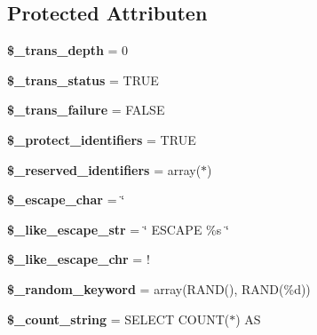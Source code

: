 \subsection*{Protected Attributen}
\begin{DoxyCompactItemize}
\item 
\mbox{\label{class_c_i___d_b__driver_a0724b7f82d62f35ef5e150146ed2a27b}} 
{\bfseries \$\+\_\+trans\+\_\+depth} = 0
\item 
\mbox{\label{class_c_i___d_b__driver_a93acf0189d34131e156c6eb4a48c2b5b}} 
{\bfseries \$\+\_\+trans\+\_\+status} = T\+R\+UE
\item 
\mbox{\label{class_c_i___d_b__driver_afb63c722ff858ef7a4f662ec2930aad3}} 
{\bfseries \$\+\_\+trans\+\_\+failure} = F\+A\+L\+SE
\item 
\mbox{\label{class_c_i___d_b__driver_a2e8a156a3c2abda43a4f160bcb5252e9}} 
{\bfseries \$\+\_\+protect\+\_\+identifiers} = T\+R\+UE
\item 
\mbox{\label{class_c_i___d_b__driver_aa3298c4c62fbee8bb09f1b75b633fb0d}} 
{\bfseries \$\+\_\+reserved\+\_\+identifiers} = array(\textquotesingle{}$\ast$\textquotesingle{})
\item 
\mbox{\label{class_c_i___d_b__driver_aaec2fb0112850159063a8e47ad3aed6e}} 
{\bfseries \$\+\_\+escape\+\_\+char} = \textquotesingle{}\char`\"{}\textquotesingle{}
\item 
\mbox{\label{class_c_i___d_b__driver_adf86ecadf3d0e1ce3f5e0eaeeb3867ae}} 
{\bfseries \$\+\_\+like\+\_\+escape\+\_\+str} = \char`\"{} E\+S\+C\+A\+PE \textquotesingle{}\%s\textquotesingle{} \char`\"{}
\item 
\mbox{\label{class_c_i___d_b__driver_a668acfd923d0342389cd3a614628cf2a}} 
{\bfseries \$\+\_\+like\+\_\+escape\+\_\+chr} = \textquotesingle{}!\textquotesingle{}
\item 
\mbox{\label{class_c_i___d_b__driver_a10213aa6e05f6d924d3277bb1d2fea00}} 
{\bfseries \$\+\_\+random\+\_\+keyword} = array(\textquotesingle{}R\+A\+ND()\textquotesingle{}, \textquotesingle{}R\+A\+ND(\%d)\textquotesingle{})
\item 
\mbox{\label{class_c_i___d_b__driver_a06c80bac2ecbd0557827e96949c23097}} 
{\bfseries \$\+\_\+count\+\_\+string} = \textquotesingle{}S\+E\+L\+E\+CT C\+O\+U\+NT($\ast$) AS \textquotesingle{}
\end{DoxyCompactItemize}


